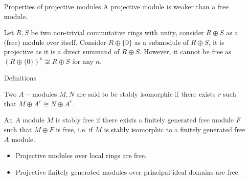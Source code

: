 \documentclass{beamer}
\begin{document}
\begin{frame}{Properties of projective modules}
		A projective module is weaker than a free module.
		\begin{lemma}
		\end{lemma}
		\begin{example}
			Let $R,S $ be two non-trivial commutative rings with unity, consider $R \oplus S$ as a (free) module over itself. Consider $R \oplus \{0\}$ as a submodule of $R \oplus S$, it is projective as it is a direct summand of $R \oplus S$. However, it cannot be free as $(R \oplus \{0\})^n \not \cong R\oplus S $ for any $n$.
		\end{example}
\end{frame}
\begin{frame}{Definitions}
		\begin{definition}\label{stabiso}
		Two $A-$modules $M,N$ are said to be stably isomorphic if there exists $r$ such that $M \oplus A^r \cong N \oplus A^r$.
	\end{definition}
	\begin{definition}\label{stabfree}
		An $A$ module $M$ is stably free if there exists a finitely generated free module $F$ such that $M \oplus F$ is free, i.e. if $M$ is stably isomorphic to a finitely generated free $A$ module.
	\end{definition}
	\begin{itemize}
		\item Projective modules over local rings are free.
		\item Projective finitely generated modules over principal ideal domains are free.
	\end{itemize}
\end{frame}
\end{document}
